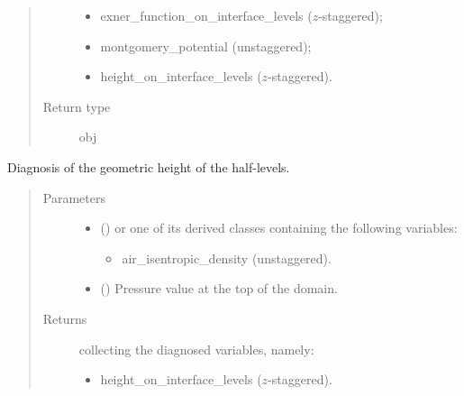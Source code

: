 \documentclass[letterpaper,10pt,english]{sphinxmanual}
\begin{document}
\begin{fulllineitems}
\begin{fulllineitems}
\begin{quote}
\begin{description}
\begin{itemize}
\item {} 
exner\_function\_on\_interface\_levels (\(z\)-staggered);

\item {} 
montgomery\_potential (unstaggered);

\item {} 
height\_on\_interface\_levels (\(z\)-staggered).

\end{itemize}


\item[{Return type}] \leavevmode
obj

\end{description}\end{quote}

\end{fulllineitems}


\begin{fulllineitems}
\label{\detokenize{api:tasmania.dycore.diagnostic_isentropic.DiagnosticIsentropic.get_height}}
Diagnosis of the geometric height of the half-levels.
\begin{quote}\begin{description}
\item[{Parameters}] \leavevmode\begin{itemize}
\item {} 
 () \textendash{} 
{\hyperref[\detokenize{api:tasmania.storages.grid_data.GridData}]{}} or one of its derived classes containing the following variables:
\begin{itemize}
\item {} 
air\_isentropic\_density (unstaggered).

\end{itemize}


\item {} 
 () \textendash{} Pressure value at the top of the domain.

\end{itemize}

\item[{Returns}] \leavevmode

{\hyperref[\detokenize{api:tasmania.storages.grid_data.GridData}]{}} collecting the diagnosed variables, namely:
\begin{itemize}
\item {} 
height\_on\_interface\_levels (\(z\)-staggered).


\end{itemize}
\end{description}
\end{quote}
\end{fulllineitems}
\end{fulllineitems}
\end{document}
